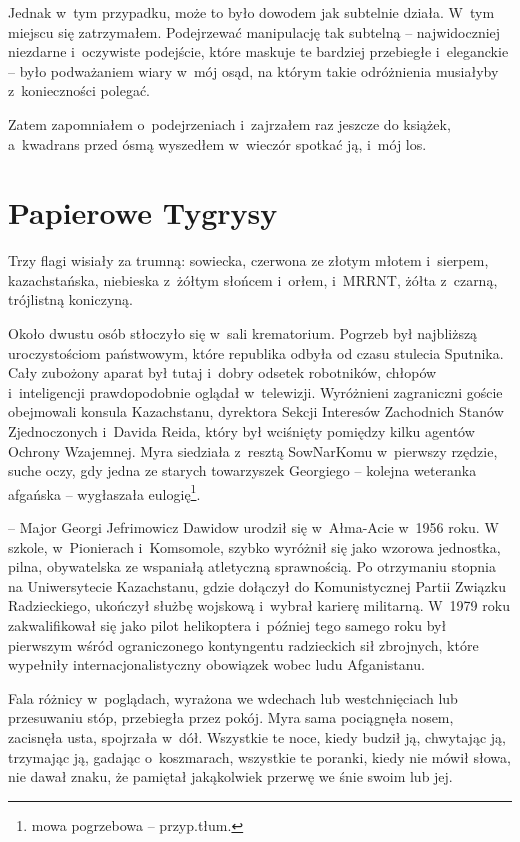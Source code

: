 \documentclass[oneside,polish,11pt,sfheadings]{mwbk}
\begin{document}
Jednak w~tym przypadku, może to było dowodem jak subtelnie działa. W~tym
miejscu się zatrzymałem. Podejrzewać manipulację tak subtelną -- najwidoczniej niezdarne i~oczywiste podejście, które maskuje te bardziej
przebiegłe i~eleganckie -- było podważaniem wiary w~mój osąd, na którym
takie odróżnienia musiałyby z~konieczności polegać.

Zatem zapomniałem o~podejrzeniach i~zajrzałem raz jeszcze do książek, a~kwadrans przed ósmą wyszedłem w~wieczór spotkać ją, i~mój los.


\chapter{Papierowe Tygrysy}

Trzy flagi wisiały za trumną: sowiecka, czerwona ze złotym młotem i~sierpem, kazachstańska, niebieska z~żółtym słońcem i~orłem, i~MRRNT,
żółta z~czarną, trójlistną koniczyną.

Około dwustu osób stłoczyło się w~sali krematorium. Pogrzeb był
najbliższą uroczystościom państwowym, które republika odbyła od czasu
stulecia Sputnika. Cały zubożony aparat był tutaj i~dobry odsetek
robotników, chłopów i~inteligencji prawdopodobnie oglądał w~telewizji.
Wyróżnieni zagraniczni goście obejmowali konsula Kazachstanu, dyrektora
Sekcji Interesów Zachodnich Stanów Zjednoczonych i~Davida Reida, który
był wciśnięty pomiędzy kilku agentów Ochrony Wzajemnej. Myra siedziała z~resztą SowNarKomu w~pierwszy rzędzie, suche oczy, gdy jedna ze starych
towarzyszek Georgiego -- kolejna weteranka afgańska -- wygłaszała
eulogię\footnote{ mowa pogrzebowa -- przyp.tłum.}.

-- Major Georgi Jefrimowicz Dawidow urodził się w~Ałma-Acie w~1956 roku.
W szkole, w~Pionierach i~Komsomole, szybko wyróżnił się jako wzorowa
jednostka, pilna, obywatelska ze wspaniałą atletyczną sprawnością. Po
otrzymaniu stopnia na Uniwersytecie Kazachstanu, gdzie dołączył do
Komunistycznej Partii Związku Radzieckiego, ukończył służbę wojskową i~wybrał karierę militarną. W~1979 roku zakwalifikował się jako pilot
helikoptera i~później tego samego roku był pierwszym wśród ograniczonego
kontyngentu radzieckich sił zbrojnych, które wypełniły
internacjonalistyczny obowiązek wobec ludu Afganistanu.

Fala różnicy w~poglądach, wyrażona we wdechach lub westchnięciach lub
przesuwaniu stóp, przebiegła przez pokój. Myra sama pociągnęła nosem,
zacisnęła usta, spojrzała w~dół. Wszystkie te noce, kiedy budził ją,
chwytając ją, trzymając ją, gadając o~koszmarach, wszystkie te poranki,
kiedy nie mówił słowa, nie dawał znaku, że pamiętał jakąkolwiek przerwę
we śnie swoim lub jej.
\end{document}
